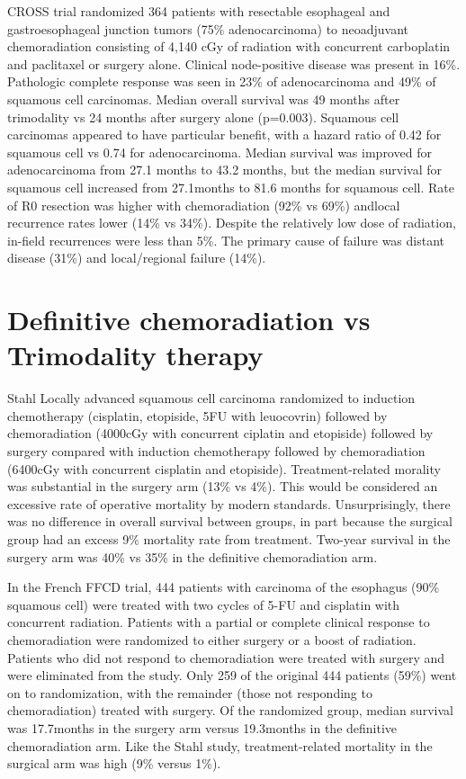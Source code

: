 \documentclass[
]{book}
\begin{document}
CROSS trial randomized 364 patients with resectable esophageal and gastroesophageal junction tumors (75\% adenocarcinoma) to neoadjuvant chemoradiation consisting of 4,140 cGy of radiation with concurrent carboplatin and paclitaxel or surgery alone.\citep{vanhagen2074} Clinical node-positive disease was present in 16\%. Pathologic complete response was seen in 23\% of adenocarcinoma and 49\% of squamous cell carcinomas. Median overall survival was 49 months after trimodality vs 24 months after surgery alone (p=0.003). Squamous cell carcinomas appeared to have particular benefit, with a hazard ratio of 0.42 for squamous cell vs 0.74 for adenocarcinoma. Median survival was improved for adenocarcinoma from 27.1 months to 43.2 months, but the median survival for squamous cell increased from 27.1months to 81.6 months for squamous cell. Rate of R0 resection was higher with chemoradiation (92\% vs 69\%) andlocal recurrence rates lower (14\% vs 34\%). Despite the relatively low dose of radiation, in-field recurrences were less than 5\%. The primary cause of failure was distant disease (31\%) and local/regional failure (14\%).\citep{oppedijk385}

\hypertarget{definitive-chemoradiation-vs-trimodality-therapy}{%
\section{Definitive chemoradiation vs Trimodality therapy}\label{definitive-chemoradiation-vs-trimodality-therapy}}

Stahl Locally advanced squamous cell carcinoma randomized to induction chemotherapy (cisplatin, etopiside, 5FU with leuocovrin) followed by chemoradiation (4000cGy with concurrent ciplatin and etopiside) followed by surgery compared with induction chemotherapy followed by chemoradiation (6400cGy with concurrent cisplatin and etopiside).\citep{stahl2310} Treatment-related morality was substantial in the surgery arm (13\% vs 4\%). This would be considered an excessive rate of operative mortality by modern standards. Unsurprisingly, there was no difference in overall survival between groups, in part because the surgical group had an excess 9\% mortality rate from treatment. Two-year survival in the surgery arm was 40\% vs 35\% in the definitive chemoradiation arm.

In the French FFCD trial, 444 patients with carcinoma of the esophagus (90\% squamous cell) were treated with two cycles of 5-FU and cisplatin with concurrent radiation.\citep{bedenne1160} Patients with a partial or complete clinical response to chemoradiation were randomized to either surgery or a boost of radiation. Patients who did not respond to chemoradiation were treated with surgery and were eliminated from the study. Only 259 of the original 444 patients (59\%) went on to randomization, with the remainder (those not responding to chemoradiation) treated with surgery. Of the randomized group, median survival was 17.7months in the surgery arm versus 19.3months in the definitive chemoradiation arm. Like the Stahl study, treatment-related mortality in the surgical arm was high (9\% versus 1\%).
\end{document}
